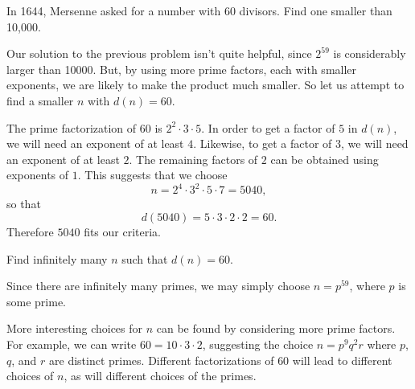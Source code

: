  In 1644, Mersenne asked for a number with $60$
divisors. Find one smaller than 10,000.
\begin{solution}
  Our solution to the previous problem isn't quite helpful, since
  $2^{59}$ is considerably larger than 10000. But, by using more prime
  factors, each with smaller exponents, we are likely to make the
  product much smaller. So let us attempt to find a smaller $n$ with
  $d(n) = 60$.

  The prime factorization of $60$ is $2^2\cdot3\cdot5$. In order to
  get a factor of $5$ in $d(n)$, we will need an exponent of at least
  $4$. Likewise, to get a factor of $3$, we will need an exponent of
  at least $2$. The remaining factors of $2$ can be obtained using
  exponents of $1$. This suggests that we choose
  \begin{equation*}
    n = 2^4\cdot3^2\cdot5\cdot7 = 5040,
  \end{equation*}
  so that
  \begin{equation*}
    d(5040) = 5\cdot3\cdot2\cdot2 = 60.
  \end{equation*}
  Therefore $5040$ fits our criteria.
\end{solution}

 Find infinitely many $n$ such that $d(n) = 60$.
\begin{solution}
  Since there are infinitely many primes, we may simply choose
  $n = p^{59}$, where $p$ is some prime.

  More interesting choices for $n$ can be found by considering more
  prime factors. For example, we can write $60 = 10\cdot3\cdot2$,
  suggesting the choice $n = p^9q^2r$ where $p$, $q$, and $r$ are
  distinct primes. Different factorizations of $60$ will lead to
  different choices of $n$, as will different choices of the primes.
\end{solution}
